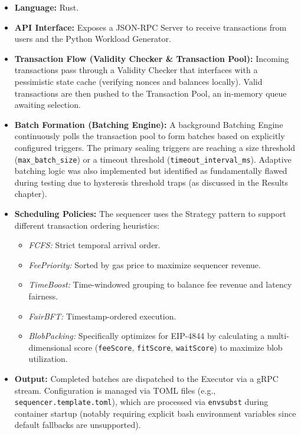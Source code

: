 \begin{itemize}
    \item \textbf{Language:} Rust.
    \item \textbf{API Interface:} Exposes a JSON-RPC Server to receive transactions from users and the Python Workload Generator.
    \item \textbf{Transaction Flow (Validity Checker \& Transaction Pool):} Incoming transactions pass through a Validity Checker that interfaces with a pessimistic state cache (verifying nonces and balances locally). Valid transactions are then pushed to the Transaction Pool, an in-memory queue awaiting selection. 
    \item \textbf{Batch Formation (Batching Engine):} A background Batching Engine continuously polls the transaction pool to form batches based on explicitly configured triggers. The primary sealing triggers are reaching a size threshold (\texttt{max\_batch\_size}) or a timeout threshold (\texttt{timeout\_interval\_ms}). Adaptive batching logic was also implemented but identified as fundamentally flawed during testing due to hysteresis threshold traps (as discussed in the Results chapter).
    \item \textbf{Scheduling Policies:} The sequencer uses the Strategy pattern to support different transaction ordering heuristics:
    \begin{itemize}
        \item \textit{FCFS:} Strict temporal arrival order.
        \item \textit{FeePriority:} Sorted by gas price to maximize sequencer revenue.
        \item \textit{TimeBoost:} Time-windowed grouping to balance fee revenue and latency fairness.
        \item \textit{FairBFT:} Timestamp-ordered execution.
        \item \textit{BlobPacking:} Specifically optimizes for EIP-4844 by calculating a multi-dimensional score (\texttt{feeScore}, \texttt{fitScore}, \texttt{waitScore}) to maximize blob utilization.
    \end{itemize}
    \item \textbf{Output:} Completed batches are dispatched to the Executor via a gRPC stream. Configuration is managed via TOML files (e.g., \texttt{sequencer.template.toml}), which are processed via \texttt{envsubst} during container startup (notably requiring explicit bash environment variables since default fallbacks are unsupported).
\end{itemize}
